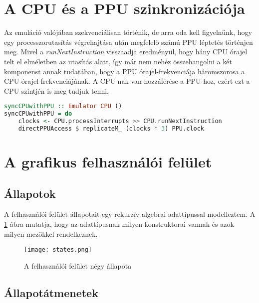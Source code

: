 \section{A CPU és a PPU szinkronizációja}
Az emuláció valójában szekvenciálisan történik, de arra oda kell figyelnünk, hogy egy processzorutasítás végrehajtása után megfelelő számú PPU léptetés történjen meg. Mivel a \emph{runNextInstruction} visszaadja eredményül, hogy hány CPU órajel telt el elméletben az utasítás alatt, így már nem nehéz összehangolni a két komponenst annak tudatában, hogy a PPU órajel-frekvenciája háromszorosa a CPU órajel-frekvenciájának.
A CPU-nak van hozzáférése a PPU-hoz, ezért ezt a CPU szintjén is meg tudjuk tenni.
\begin{lstlisting}[language=Haskell, basicstyle=\scriptsize]
syncCPUwithPPU :: Emulator CPU ()
syncCPUwithPPU = do
	clocks <- CPU.processInterrupts >> CPU.runNextInstruction
	directPPUAccess $ replicateM_ (clocks * 3) PPU.clock
\end{lstlisting}

\section{A grafikus felhasználói felület}
\label{lab:gui}

\subsection{Állapotok}

A felhasználói felület állapotait egy rekurzív algebrai adattípussal modelleztem. A \ref{fig:guistate} ábra mutatja, hogy az adattípusnak milyen konstruktorai vannak és azok milyen mezőkkel rendelkeznek.

\begin{figure}[H]
	\centering
	\texttt{[image: states.png]}
	\caption{A felhasználói felület négy állapota}
	\label{fig:guistate}
\end{figure}

\subsection{Állapotátmenetek}

